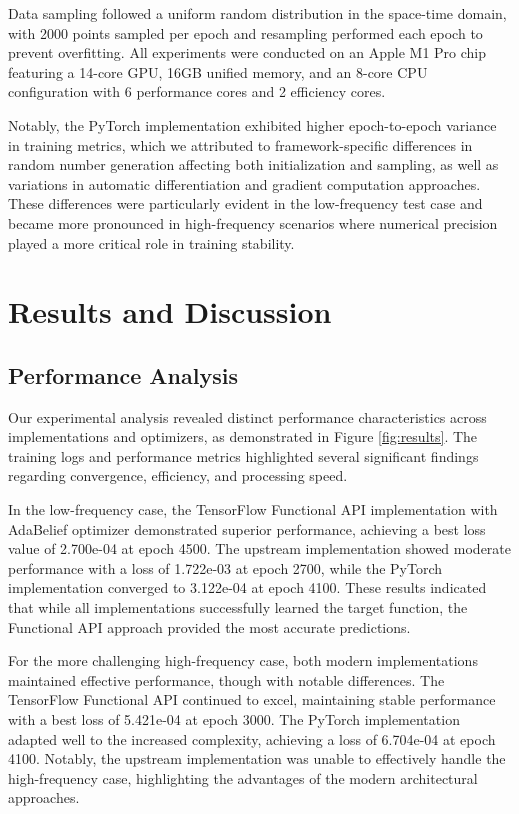 \documentclass[10pt,journal,compsoc,onecolumn]{IEEEtran}
\begin{document}
Data sampling followed a uniform random distribution in the space-time domain, with 2000 points sampled per epoch and resampling performed each epoch to prevent overfitting. All experiments were conducted on an Apple M1 Pro chip featuring a 14-core GPU, 16GB unified memory, and an 8-core CPU configuration with 6 performance cores and 2 efficiency cores.

Notably, the PyTorch implementation exhibited higher epoch-to-epoch variance in training metrics, which we attributed to framework-specific differences in random number generation affecting both initialization and sampling, as well as variations in automatic differentiation and gradient computation approaches. These differences were particularly evident in the low-frequency test case and became more pronounced in high-frequency scenarios where numerical precision played a more critical role in training stability.

\section{Results and Discussion}
\subsection{Performance Analysis}
Our experimental analysis revealed distinct performance characteristics across implementations and optimizers, as demonstrated in Figure \ref{fig:results}. The training logs and performance metrics highlighted several significant findings regarding convergence, efficiency, and processing speed.

In the low-frequency case, the TensorFlow Functional API implementation with AdaBelief optimizer demonstrated superior performance, achieving a best loss value of 2.700e-04 at epoch 4500. The upstream implementation showed moderate performance with a loss of 1.722e-03 at epoch 2700, while the PyTorch implementation converged to 3.122e-04 at epoch 4100. These results indicated that while all implementations successfully learned the target function, the Functional API approach provided the most accurate predictions.

For the more challenging high-frequency case, both modern implementations maintained effective performance, though with notable differences. The TensorFlow Functional API continued to excel, maintaining stable performance with a best loss of 5.421e-04 at epoch 3000. The PyTorch implementation adapted well to the increased complexity, achieving a loss of 6.704e-04 at epoch 4100. Notably, the upstream implementation was unable to effectively handle the high-frequency case, highlighting the advantages of the modern architectural approaches.
\end{document}
